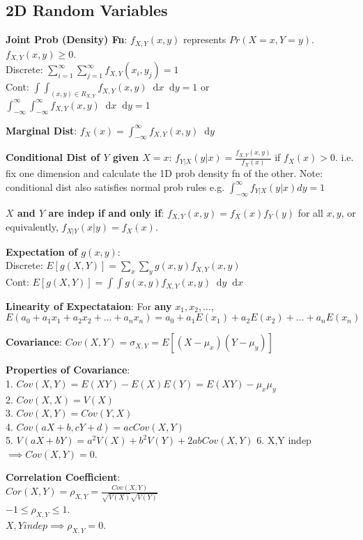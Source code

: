 \documentclass[a4paper,landscape]{article}
\newcommand{\rntopic}[1]{\vspace{-2.0em}\subsection*{#1}\vspace{-1.0em}}
\newcommand{\rnname}[1]{\textbf{#1}}
\newcommand*\dif{\mathop{}\!\mathrm{d}}
\begin{document}
\begin{multicols*}{4}
\rntopic{2D Random Variables}
\vspace{0.3cm}
\begin{flatitemize}
\item \rnname{Joint Prob (Density) Fn}: $f_{X, Y}(x, y)$ represents $Pr(X = x, Y = y)$. $f_{X, Y}(x, y) \geq 0$. \\
Discrete: $\sum_{i=1}^{\infty} \sum_{j=1}^{\infty}f_{X, Y}(x_i, y_j) = 1$ \\
Cont: $\int \int_{(x, y) \in R_{X, Y}}f_{X, Y}(x, y) \dif x  \dif y = 1$ or $\int_{-\infty}^{\infty} \int_{-\infty}^{\infty} f_{X, Y}(x, y) \dif x  \dif y = 1$
\item \rnname{Marginal Dist}: $f_{X}(x) = \int_{-\infty}^{\infty}f_{X, Y}(x, y) \dif y$
\item \rnname{Conditional Dist of $Y$ given $X = x$}: $f_{Y|X}(y|x) = \frac{f_{X, Y}(x, y)}{f_{X}(x)}$ if $f_X(x) > 0$. i.e. fix one dimension and calculate the 1D prob density fn of the other. Note: conditional dist also satisfies normal prob rules e.g. $\int_{-\infty}^{\infty} f_{Y|X}(y|x)dy = 1$
\item \rnname{$X$ and $Y$ are indep if and only if}: $f_{X, Y}(x, y) = f_{X}(x)f_{Y}(y)$ for all $x, y$, or equivalently,
$f_{X|Y}(x|y) = f_{X}(x)$.
\item \rnname{Expectation of $g(x,y)$}:\\
Discrete: $E[g( X,Y)]=\sum_{x}\sum_{y}g( x,y)f_{X,Y}(x,y)$\\
Cont: $E[g(X,Y)]=\int \int g(x,y)f_{X,Y}(x,y) \dif y \dif x$
\item \rnname{Linearity of Expectataion}: For \textbf{any} $x_1, x_2, ...$, $E(a_0 + a_1 x_1 + a_2 x_2 + ... + a_n x_n) = a_0 + a_1 E(x_1) + a_2 E(x_2) + ... + a_n E(x_n)$
\item \rnname{Covariance}: $Cov(X,Y) = \sigma_{X,Y} = E[(X-\mu_x)(Y-\mu_y)]$
\item \rnname{Properties of Covariance}: \\
1. $Cov(X,Y) = E(XY) - E(X)E(Y) = E(XY) - \mu_x \mu_y$ \\
2. $Cov(X,X) = V(X)$\\
3. $Cov(X,Y) = Cov(Y,X)$ \\
4. $Cov(aX + b, cY + d) = acCov(X,Y)$\\
5. $V(aX+bY) = a^2V(X)+b^2V(Y) + 2abCov(X,Y)$
6. X,Y indep $\implies Cov(X,Y) = 0$.
\item \rnname{Correlation Coefficient}: \\
$Cor(X,Y) = \rho_{X,Y} = \frac{Cov(X,Y)}{\sqrt{V(X)}\sqrt{V(Y)}}$ \\
$-1 \leq \rho_{X,Y} \leq 1$. \\
$X, Y indep \implies \rho_{X,Y} = 0$.
\end{flatitemize}


\end{multicols*}
\end{document}
